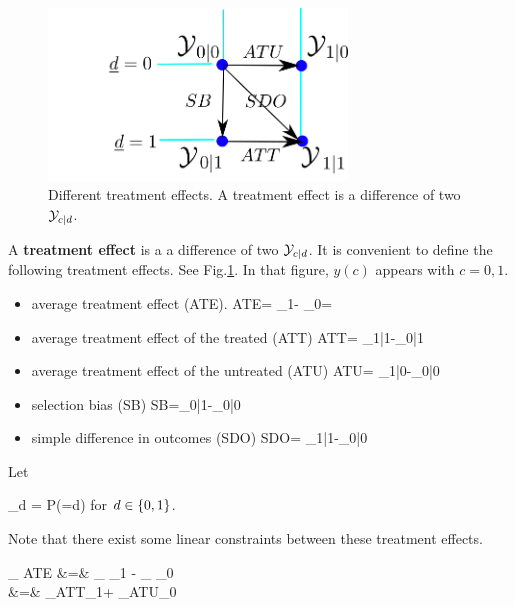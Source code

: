 \begin{figure}[h!]
\centering
\includegraphics[height=1.8in]
{pot-out/y-diffs-square.png}
\caption{Different treatment effects.  
A treatment effect is a difference of 
two ${\cal Y}_{c| d }$.} 
\label{fig-y-diffs-square}
\end{figure}

A {\bf treatment effect} is a
a difference of two  ${\cal Y}_{c| d }$.
It is convenient to
define the following 
treatment effects. 
See Fig.\ref{fig-y-diffs-square}.
In that figure, $y(c)$ appears  with
$c=0,1$.




\begin{itemize}


\item average treatment effect
 (ATE).
\beq
{\color{red}ATE}=
\caly_{1}-
\caly_{0}= \delta
\eeq

\item average treatment effect 
of the treated (ATT)
\beq
{\color{red}ATT}=
\caly_{1|1}-\caly_{0|1}
\eeq


\item average
treatment effect of the untreated (ATU)
\beq
{\color{red}ATU}=
\caly_{1|0}-\caly_{0|0}
\eeq

\item selection bias (SB)
\beq
{\color{red}SB}=\caly_{0|1}-\caly_{0|0}
\eeq


\item simple difference in outcomes (SDO)
\beq
{\color{red} SDO}= \caly_{1|1}-\caly_{0|0}
\eeq


\end{itemize}



Let

\beq
\pi_d = P(\rvd=d)
\eeq
for $d\in \{0,1\}$.

Note that there
exist some linear 
constraints between 
these treatment effects.



\beqa
{}_
{ATE}
&=&
_
{\caly_1}
-
_
{\caly_0}
\\
&=&
 _{ATT}\pi_1+
 _{ATU}\pi_0
\label{eq-ate-att-atu}
\eeqa

